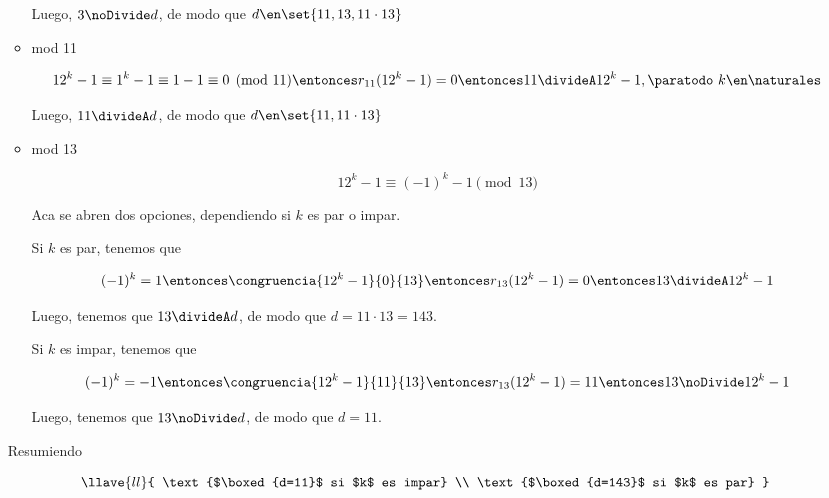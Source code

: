 \begin{enumerate}[label=(\alph*)]
\begin{itemize}
        Luego, $3 \noDivide d$, de modo que $d \en \set{11,13,11 \cdot 13}$

        \item mod 11

        $$
        12^k-1 \equiv 1^k-1 \equiv 1-1 \equiv 0 \pmod{11}
        \entonces
        r_{11}(12^k-1)=0
        \entonces
        11 \divideA 12^k-1, \paratodo ~ k \en \naturales
        $$

        Luego, $11 \divideA d$, de modo que $d \en \set{11,11 \cdot 13}$

        \item mod 13

        $$
        12^k-1 \equiv (-1)^k-1 \pmod{13}
        $$

        Aca se abren dos opciones, dependiendo si $k$ es par o impar.\bigskip

        Si $k$ es par, tenemos que 
        
        $$
        (-1)^k=1
        \entonces
        \congruencia{12^k-1}{0}{13}
        \entonces 
        r_{13}(12^k-1)=0
        \entonces
        13 \divideA 12^k-1
        $$
        
        Luego, tenemos que $13 \divideA d$, de modo que $d= 11 \cdot 13=143$. \bigskip

        Si $k$ es impar, tenemos que 
        
        $$
        (-1)^k=-1
        \entonces
        \congruencia{12^k-1}{11}{13}
        \entonces 
        r_{13}(12^k-1)=11
        \entonces
        13 \noDivide 12^k-1
        $$
        
        Luego, tenemos que $13 \noDivide d$, de modo que $d= 11$. 

      \end{itemize}
    
    Resumiendo

    $$
    \llave{ll}{
      \text{$\boxed{d=11}$ si $k$ es impar} \\
      \text{$\boxed{d=143}$ si $k$ es par}
    }
    $$

\end{enumerate} 


\begin{aportes}
     \item {}
\end{aportes}
     
